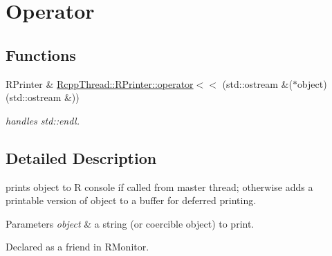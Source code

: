 \hypertarget{group__operator}{}\section{Operator}
\label{group__operator}
\subsection*{Functions}
\begin{DoxyCompactItemize}
\item 
R\+Printer \& \hyperlink{group__operator_ga1f4bfba8cc5853c021816ffce7714601}{Rcpp\+Thread\+::\+R\+Printer\+::operator$<$$<$} (std\+::ostream \&($\ast$object)(std\+::ostream \&))\hypertarget{group__operator_ga1f4bfba8cc5853c021816ffce7714601}{}\label{group__operator_ga1f4bfba8cc5853c021816ffce7714601}

\begin{DoxyCompactList}\small\item\em handles std\+::endl. \end{DoxyCompactList}\end{DoxyCompactItemize}


\subsection{Detailed Description}
prints {\ttfamily object} to R console íf called from master thread; otherwise adds a printable version of {\ttfamily object} to a buffer for deferred printing. 
\begin{DoxyParams}{Parameters}
{\em object} & a string (or coercible object) to print.\\
\hline
\end{DoxyParams}
Declared as a friend in {\ttfamily R\+Monitor}. 